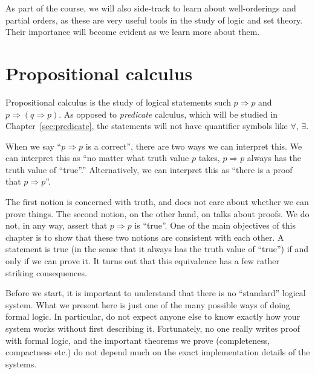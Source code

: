 \documentclass[a4paper]{article}
\begin{document}
As part of the course, we will also side-track to learn about well-orderings and partial orders, as these are very useful tools in the study of logic and set theory. Their importance will become evident as we learn more about them.

\section{Propositional calculus}
\label{sec:propositional}
Propositional calculus is the study of logical statements such $p \Rightarrow p$ and $p \Rightarrow (q\Rightarrow p)$. As opposed to \emph{predicate} calculus, which will be studied in Chapter~\ref{sec:predicate}, the statements will not have quantifier symbols like $\forall$, $\exists$.

When we say ``$p \Rightarrow p$ is a correct'', there are two ways we can interpret this. We can interpret this as ``no matter what truth value $p$ takes, $p \Rightarrow p$ always has the truth value of ``true''.'' Alternatively, we can interpret this as ``there is a proof that $p \Rightarrow p$''.

The first notion is concerned with truth, and does not care about whether we can prove things. The second notion, on the other hand, on talks about proofs. We do not, in any way, assert that $p \Rightarrow p$ is ``true''. One of the main objectives of this chapter is to show that these two notions are consistent with each other. A statement is true (in the sense that it always has the truth value of ``true'') if and only if we can prove it. It turns out that this equivalence has a few rather striking consequences.

Before we start, it is important to understand that there is no ``standard'' logical system. What we present here is just one of the many possible ways of doing formal logic. In particular, do not expect anyone else to know exactly how your system works without first describing it. Fortunately, no one really writes proof with formal logic, and the important theorems we prove (completeness, compactness etc.) do not depend much on the exact implementation details of the systems.
\end{document}
